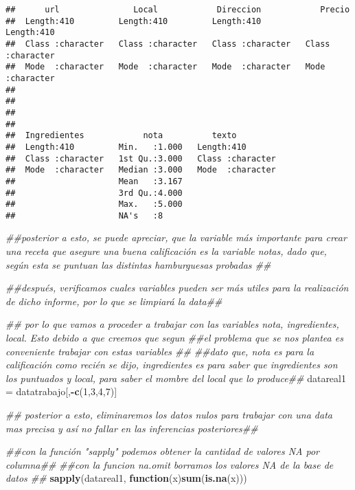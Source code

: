 \documentclass[
]{article}
\newenvironment{Shaded}{\begin{snugshade}}{\end{snugshade}}
\newcommand{\CommentTok}[1]{\textcolor[rgb]{0.56,0.35,0.01}{\textit{#1}}}
\newcommand{\ControlFlowTok}[1]{\textcolor[rgb]{0.13,0.29,0.53}{\textbf{#1}}}
\newcommand{\DecValTok}[1]{\textcolor[rgb]{0.00,0.00,0.81}{#1}}
\newcommand{\KeywordTok}[1]{\textcolor[rgb]{0.13,0.29,0.53}{\textbf{#1}}}
\newcommand{\NormalTok}[1]{#1}
\newcommand{\OperatorTok}[1]{\textcolor[rgb]{0.81,0.36,0.00}{\textbf{#1}}}
\newcommand{\StringTok}[1]{\textcolor[rgb]{0.31,0.60,0.02}{#1}}
\begin{document}
\begin{verbatim}
##      url               Local            Direccion            Precio         
##  Length:410         Length:410         Length:410         Length:410        
##  Class :character   Class :character   Class :character   Class :character  
##  Mode  :character   Mode  :character   Mode  :character   Mode  :character  
##                                                                             
##                                                                             
##                                                                             
##                                                                             
##  Ingredientes            nota          texto          
##  Length:410         Min.   :1.000   Length:410        
##  Class :character   1st Qu.:3.000   Class :character  
##  Mode  :character   Median :3.000   Mode  :character  
##                     Mean   :3.167                     
##                     3rd Qu.:4.000                     
##                     Max.   :5.000                     
##                     NA's   :8
\end{verbatim}

\begin{Shaded}
\begin{Highlighting}[]
\CommentTok{##posterior a esto, se puede apreciar, que la variable más importante para crear una receta que asegure una buena calificación es la variable notas, dado que, según esta se puntuan las distintas hamburguesas probadas ##}

\CommentTok{##después, verificamos cuales variables pueden ser más utiles para la realización de dicho informe, por lo que se limpiará la data##}

\CommentTok{## por lo que vamos a proceder a trabajar con las variables nota, ingredientes, local. Esto debido a que creemos que segun}
\CommentTok{##el problema que se nos plantea es conveniente trabajar con estas variables ##}
\CommentTok{##dato que, nota es para la calificación como recién se dijo, ingredientes es para saber que ingredientes son los puntuados y local, para saber el mombre del local que lo produce##}
\NormalTok{datareal1 =}\StringTok{ }\NormalTok{datatrabajo[,}\OperatorTok{-}\KeywordTok{c}\NormalTok{(}\DecValTok{1}\NormalTok{,}\DecValTok{3}\NormalTok{,}\DecValTok{4}\NormalTok{,}\DecValTok{7}\NormalTok{)]}


\CommentTok{## posterior a esto, eliminaremos los datos nulos para trabajar con una data mas precisa y así no fallar en las inferencias posteriores##}

\CommentTok{##con la función "sapply" podemos obtener la cantidad de valores NA por columna##}
\CommentTok{##con la funcion na.omit borramos los valores NA de la base de datos ##}
\KeywordTok{sapply}\NormalTok{(datareal1, }\ControlFlowTok{function}\NormalTok{(x)}\KeywordTok{sum}\NormalTok{(}\KeywordTok{is.na}\NormalTok{(x)))}
\end{Highlighting}
\end{Shaded}
\end{document}
